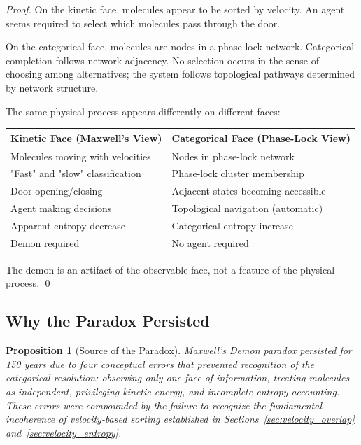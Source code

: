 \documentclass[12pt,a4paper]{article}
\newtheorem{proposition}[theorem]{Proposition}
\theoremstyle{definition}
\theoremstyle{remark}
\begin{document}
\begin{proof}
On the kinetic face, molecules appear to be sorted by velocity. An agent seems required to select which molecules pass through the door.

On the categorical face, molecules are nodes in a phase-lock network. Categorical completion follows network adjacency. No selection occurs in the sense of choosing among alternatives; the system follows topological pathways determined by network structure.

The same physical process appears differently on different faces:

\begin{center}
\begin{tabular}{l|l}
\textbf{Kinetic Face (Maxwell's View)} & \textbf{Categorical Face (Phase-Lock View)} \\
\hline
Molecules moving with velocities & Nodes in phase-lock network \\
"Fast" and "slow" classification & Phase-lock cluster membership \\
Door opening/closing & Adjacent states becoming accessible \\
Agent making decisions & Topological navigation (automatic) \\
Apparent entropy decrease & Categorical entropy increase \\
Demon required & No agent required
\end{tabular}
\end{center}

The demon is an artifact of the observable face, not a feature of the physical process. \qed
\end{proof}

\subsection{Why the Paradox Persisted}

\begin{proposition}[Source of the Paradox]
\label{prop:paradox_source}
Maxwell's Demon paradox persisted for 150 years due to four conceptual errors that prevented recognition of the categorical resolution: observing only one face of information, treating molecules as independent, privileging kinetic energy, and incomplete entropy accounting. These errors were compounded by the failure to recognize the fundamental incoherence of velocity-based sorting established in Sections~\ref{sec:velocity_overlap} and~\ref{sec:velocity_entropy}.
\end{proposition}
\end{document}
